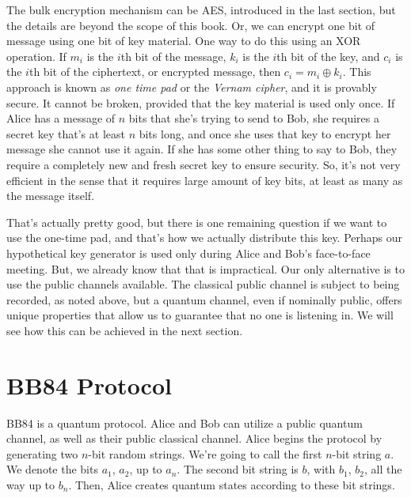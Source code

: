 The bulk encryption mechanism can be AES, introduced in the last section, but the details are beyond the scope of this book. Or, we can encrypt one bit of message using one bit of key material.  One way to do this using an XOR operation.  If $m_i$ is the $i$th bit of the message, $k_i$ is the $i$th bit of the key, and $c_i$ is the $i$th bit of the ciphertext, or encrypted message, then $c_i = m_i \oplus k_i$.  This approach is known as \emph{one time pad} or the \emph{Vernam cipher}, and it is provably secure. It cannot be broken, provided that the key material is used only once. If Alice has a message of $n$ bits that she's trying to send to Bob, she requires a secret key that's at least $n$ bits long, and once she uses that key to encrypt her message she cannot use it again. If she has some other thing to say to Bob, they require a completely new and fresh secret key to ensure security. So, it's not very efficient in the sense that it requires large amount of key bits, at least as many as the message itself.

That's actually pretty good, but there is one remaining question if we want to use the one-time pad, and that's how we actually distribute this key.  Perhaps our hypothetical key generator is used only during Alice and Bob's face-to-face meeting.  But, we already know that that is impractical.  Our only alternative is to use the public channels available.  The classical public channel is subject to being recorded, as noted above, but a quantum channel, even if nominally public, offers unique properties that allow us to guarantee that no one is listening in.  We will see how this can be achieved in the next section.

\section{BB84 Protocol}
\label{sec:bb84-protocol}

BB84 is a quantum protocol.  Alice and Bob can utilize a public quantum channel, as well as their public classical channel.  Alice begins the protocol by generating two $n$-bit random strings. We're going to call the first $n$-bit string $a$.  We denote the bits $a_1$, $a_2$, up to $a_n$. The second bit string is $b$, with $b_1$, $b_2$, all the way up to $b_n$.  Then, Alice creates quantum states according to these bit strings.

